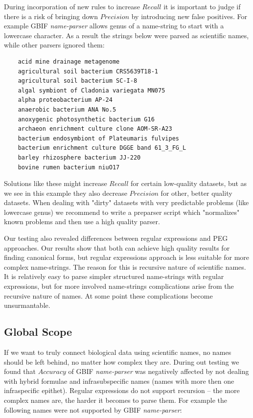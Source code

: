 \documentclass{bmcart}
\begin{document}
During incorporation of new rules to increase $Recall$ it is important to judge
if there is a risk of bringing down $Precision$ by introducing new false
positives.  For example GBIF \textit{name-parser} allows genus of a name-string
to start with a lowercase character. As a result the strings below were parsed
as scientific names, while other parsers ignored them:


\vspace{0.5cm}
\begin{verbatim}
    acid mine drainage metagenome
    agricultural soil bacterium CRS5639T18-1
    agricultural soil bacterium SC-I-8
    algal symbiont of Cladonia variegata MN075
    alpha proteobacterium AP-24
    anaerobic bacterium ANA No.5
    anoxygenic photosynthetic bacterium G16
    archaeon enrichment culture clone AOM-SR-A23
    bacterium endosymbiont of Plateumaris fulvipes
    bacterium enrichment culture DGGE band 61_3_FG_L
    barley rhizosphere bacterium JJ-220
    bovine rumen bacterium niuO17
\end{verbatim}
\vspace{0.5cm}

Solutions like these might increase $Recall$ for certain low-quality datasets,
but as we see in this example they also decrease $Precision$ for other, better
quality datasets. When dealing with "dirty" datasets with very predictable
problems (like lowercase genus) we recommend to write a preparser script which
"normalizes" known problems and then use a high quality parser.

Our testing also revealed differences between regular expressions and PEG
approaches. Our results show that both can achieve high quality results for
finding canonical forms, but regular expressions approach is less suitable for
more complex name-strings. The reason for this is recursive nature of
scientific names.  It is relatively easy to parse simpler structured
name-strings with regular expressions, but for more involved name-strings
complications arise from the recursive nature of names. At some point these
complications become unsurmantable.

\subsection*{Global Scope}

If we want to truly connect biological data using scientific names, no names
should be left behind, no matter how complex they are. During out testing we
found that $Accuracy$ of GBIF \textit{name-parser} was negatively affected by
not dealing with hybrid formulae and infrasubspecific names (names with more
then one infraspecific epithet). Regular expressions do not support
recursion -- the more complex names are, the harder it becomes to parse them.
For example the following names were not supported by GBIF
\textit{name-parser}:
\end{document}

